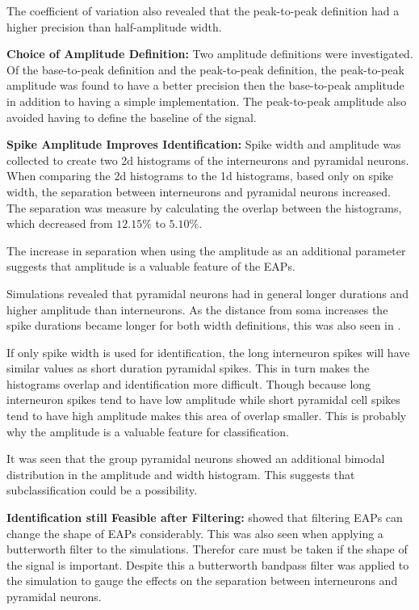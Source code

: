 \documentclass[altfont, fleqn]{uiophd}
\begin{document}
The coefficient of variation also revealed that the 
peak-to-peak definition had a higher precision than 
half-amplitude width. 
\newline

\noindent
{\bf Choice of Amplitude Definition:}
Two amplitude definitions were investigated. 
Of the base-to-peak definition and the
peak-to-peak definition,
the peak-to-peak amplitude 
was found to have a better precision
then the base-to-peak amplitude in addition to having a
simple implementation. 
The peak-to-peak amplitude also avoided
having to define the baseline of the signal. 
\newline

\noindent
{\bf Spike Amplitude Improves Identification:}
Spike width and amplitude was collected to create two 2d histograms
of the interneurons and pyramidal neurons. 
When comparing the 2d histograms to the 1d histograms, based only 
on spike width, the separation between interneurons
and pyramidal neurons increased. 
The separation was measure by calculating the overlap
between the histograms, which decreased from 
$12.15\%$
to
$5.10\%$. 

The increase in separation when using the amplitude as an additional
parameter suggests that amplitude is a valuable feature
of the EAPs.

Simulations revealed that pyramidal neurons had in general
longer durations and higher amplitude than interneurons.
As the distance from soma increases the spike durations became 
longer for both width definitions, 
this was also seen in 
\textcite{pettersen_amplitude_2008}.

If only spike width is used for identification, 
the long interneuron spikes
will have similar values as short duration pyramidal spikes. 
This in turn makes the histograms overlap and identification
more difficult. 
Though because 
long interneuron spikes tend to have low amplitude
while short pyramidal cell spikes tend to have high amplitude makes
this area of overlap smaller. 
This is probably why the amplitude is a valuable feature for
classification. 

It was seen that the group pyramidal neurons showed
an additional bimodal distribution in the amplitude and 
width histogram.
This
suggests that subclassification could be a possibility.
\newline

\noindent
{\bf Identification still Feasible after Filtering:}
\Textcite{quian_quiroga_what_2009} 
showed that filtering EAPs can change the
shape of EAPs considerably. 
This was also seen 
when applying a butterworth filter to the simulations. 
Therefor care must be taken if the shape of the signal is important. 
Despite this a butterworth bandpass filter was applied to the 
simulation to gauge the effects on the separation between
interneurons and pyramidal neurons. 
\end{document}

